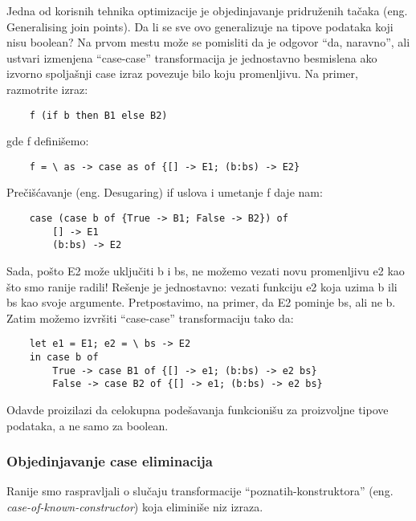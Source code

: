 Jedna od korisnih tehnika optimizacije je objedinjavanje pridruženih tačaka (eng. Generalising join points). Da li se sve ovo generalizuje na tipove podataka koji nisu boolean? Na prvom mestu može se pomisliti da je odgovor “da, naravno”, ali ustvari izmenjena “case-case” transformacija je jednostavno besmislena ako izvorno spoljašnji case izraz povezuje bilo koju promenljivu. Na primer, razmotrite izraz:
\begin{verbatim}
	f (if b then B1 else B2)
\end{verbatim}
gde f definišemo:
\begin{verbatim}
	f = \ as -> case as of {[] -> E1; (b:bs) -> E2}
\end{verbatim}
Prečišćavanje (eng. Desugaring) if uslova i umetanje f daje nam:
\begin{verbatim}
	case (case b of {True -> B1; False -> B2}) of
		[] -> E1
		(b:bs) -> E2
\end{verbatim}
Sada, pošto E2 može uključiti b i bs, ne možemo vezati novu promenljivu e2 kao što smo ranije radili! Rešenje je jednostavno: vezati funkciju e2 koja uzima b ili bs kao svoje argumente. Pretpostavimo, na primer, da E2 pominje bs, ali ne b. Zatim možemo izvršiti “case-case” transformaciju tako da:
\begin{verbatim}
	let e1 = E1; e2 = \ bs -> E2
	in case b of
		True -> case B1 of {[] -> e1; (b:bs) -> e2 bs}
		False -> case B2 of {[] -> e1; (b:bs) -> e2 bs}
\end{verbatim}

Odavde proizilazi da celokupna podešavanja funkcionišu za proizvoljne tipove podataka, a ne samo za boolean.

\subsubsection{Objedinjavanje case eliminacija}

Ranije smo raspravljali o slučaju transformacije “poznatih-konstruktora” (eng. \emph{case-of-known-constructor}) koja eliminiše niz izraza. 

